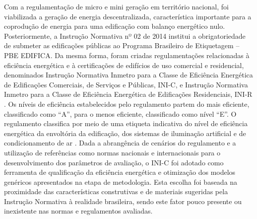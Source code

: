 \begin{onehalfspace}
Com a regulamentação de micro e mini geração em território nacional, foi viabilizada a geração de energia descentralizada, característica importante para a coprodução de energia para uma edificação com balanço energético nulo.\vspace{0.3cm} \newline
Posteriormente, a Instrução Normativa nº 02 de 2014 institui a obrigatoriedade de submeter as edificações públicas ao Programa Brasileiro de Etiquetagem – PBE EDIFICA. Da mesma forma, foram criadas regulamentações relacionadas à eficiência energética e à certificações de edifícios de uso comercial e residencial, denominados Instrução Normativa Inmetro para a Classe de Eficiência Energética de Edificações Comerciais, de Serviços e Públicas, INI-C, e Instrução Normativa Inmetro para a Classe de Eficiência Energética de Edificações Residenciais, INI-R \cite{Dalbem2017,InstitutoNacionaldeMetrologiaNormalizacaoeQualidadeIndustrial-INMETRO2018}.\vspace{0.3cm} \newline
Os níveis de eficiência estabelecidos pelo regulamento partem do mais eficiente, classificado como “A”, para o menos eficiente, classificado como nível “E”. O regulamento classifica por meio de uma etiqueta indicativa do nível de eficiência energética da envoltória da edificação, dos sistemas de iluminação artificial e de condicionamento de ar \cite{InstitutoNacionaldeMetrologiaNormalizacaoeQualidadeIndustrial-INMETRO2018a}.\vspace{0.3cm} \newline
Dada a abrangência de cenários do regulamento e a utilização de referências como normas nacionais e internacionais para o desenvolvimento dos parâmetros de avaliação, o INI-C foi adotado como ferramenta de qualificação da eficiência energética e otimização dos modelos genéricos apresentados na etapa de metodologia. Esta escolha foi baseada na proximidade das características construtivas e de materiais sugeridas pela Instrução Normativa à realidade brasileira, sendo este fator pouco presente ou inexistente nas normas e regulamentos avaliadas.

\end{onehalfspace}
